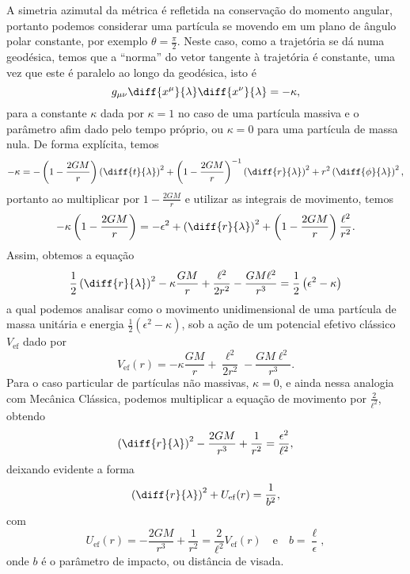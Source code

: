 A simetria azimutal da métrica é refletida na conservação do momento angular, portanto podemos considerar uma partícula se movendo em um plano de ângulo polar constante, por exemplo \(\theta = \frac{\pi}{2}\). Neste caso, como a trajetória se dá numa geodésica, temos que a \enquote{norma} do vetor tangente à trajetória é constante, uma vez que este é paralelo ao longo da geodésica, isto é
\begin{equation*}
    g_{\mu\nu}\diff{x^\mu}{\lambda} \diff{x^\nu}{\lambda} = -\kappa,
\end{equation*}
para a constante \(\kappa\) dada por \(\kappa = 1\) no caso de uma partícula massiva e o parâmetro afim dado pelo tempo próprio, ou \(\kappa = 0\) para uma partícula de massa nula. De forma explícita, temos
\begin{equation*}
    -\kappa = -\left(1 - \frac{2GM}{r}\right)\left(\diff{t}{\lambda}\right)^2 + \left(1 - \frac{2GM}{r}\right)^{-1}\left(\diff{r}{\lambda}\right)^2 + r^2\left(\diff{\phi}{\lambda}\right)^2,
\end{equation*}
portanto ao multiplicar por \(1 - \frac{2GM}{r}\) e utilizar as integrais de movimento, temos
\begin{equation*}
    -\kappa\left(1 - \frac{2GM}{r}\right) = - \epsilon^2 + \left(\diff{r}{\lambda}\right)^2 + \left(1 - \frac{2GM}{r}\right)\frac{\ell^2}{r^2}.
\end{equation*}
Assim, obtemos a equação
\begin{equation*}
    \frac12\left(\diff{r}{\lambda}\right)^2 - \kappa \frac{GM}{r} + \frac{\ell^2}{2r^2} - \frac{GM\ell^2}{r^3} = \frac12 \left(\epsilon^2 - \kappa\right)
\end{equation*}
a qual podemos analisar como o movimento unidimensional de uma partícula de massa unitária  e energia \(\frac12 \left(\epsilon^2 - \kappa\right)\), sob a ação de um potencial efetivo clássico \(V_\mathrm{ef}\) dado por
\begin{equation*}
    V_\mathrm{ef}(r) = - \kappa \frac{GM}{r} + \frac{\ell^2}{2r^2} - \frac{GM\ell^2}{r^3}.
\end{equation*}
Para o caso particular de partículas não massivas, \(\kappa = 0\), e ainda nessa analogia com Mecânica Clássica, podemos multiplicar a equação de movimento por \(\frac{2}{\ell^2}\), obtendo
\begin{equation*}
    \left(\diff{r}{\lambda}\right)^2 - \frac{2GM}{r^3} + \frac{1}{r^2} = \frac{\epsilon^2}{\ell^2},
\end{equation*}
deixando evidente a forma
\begin{equation*}
    \left(\diff{r}{\lambda}\right)^2 + U_\mathrm{ef}(r) = \frac{1}{b^2},
\end{equation*}
com
\begin{equation*}
    U_\mathrm{ef}(r) = - \frac{2GM}{r^3} + \frac{1}{r^2} = \frac{2}{\ell^2}V_\mathrm{ef}(r)\quad\text{e}\quad b = \frac{\ell}{\epsilon},
\end{equation*}
onde \(b\) é o parâmetro de impacto, ou distância de visada.
